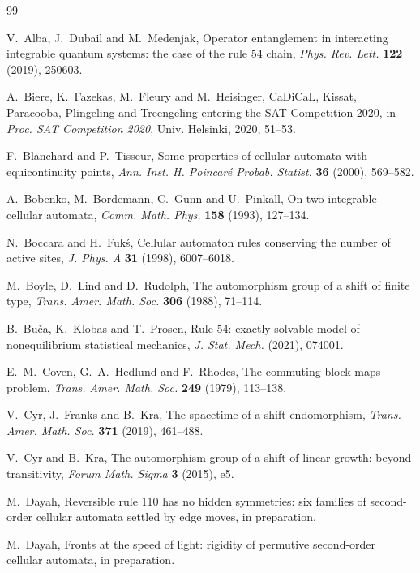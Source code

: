 \begin{thebibliography}{99}

 V.~Alba, J.~Dubail and M.~Medenjak, Operator entanglement in interacting integrable quantum systems: the case of the rule 54 chain, \emph{Phys. Rev. Lett.} \textbf{122} (2019), 250603.

 A.~Biere, K.~Fazekas, M.~Fleury and M.~Heisinger, CaDiCaL, Kissat, Paracooba, Plingeling and Treengeling entering the SAT Competition 2020, in \emph{Proc. SAT Competition 2020}, Univ. Helsinki, 2020, 51--53.

 F.~Blanchard and P.~Tisseur, Some properties of cellular automata with equicontinuity points, \emph{Ann. Inst. H. Poincar\'e Probab. Statist.} \textbf{36} (2000), 569--582.

 A.~Bobenko, M.~Bordemann, C.~Gunn and U.~Pinkall, On two integrable cellular automata, \emph{Comm. Math. Phys.} \textbf{158} (1993), 127--134.

 N.~Boccara and H.~Fuk\'s, Cellular automaton rules conserving the number of active sites, \emph{J. Phys. A} \textbf{31} (1998), 6007--6018.

 M.~Boyle, D.~Lind and D.~Rudolph, The automorphism group of a shift of finite type, \emph{Trans. Amer. Math. Soc.} \textbf{306} (1988), 71--114.

 B.~Bu\v{c}a, K.~Klobas and T.~Prosen, Rule 54: exactly solvable model of nonequilibrium statistical mechanics, \emph{J. Stat. Mech.} (2021), 074001.

 E.~M.~Coven, G.~A.~Hedlund and F.~Rhodes, The commuting block maps problem, \emph{Trans. Amer. Math. Soc.} \textbf{249} (1979), 113--138.

 V.~Cyr, J.~Franks and B.~Kra, The spacetime of a shift endomorphism, \emph{Trans. Amer. Math. Soc.} \textbf{371} (2019), 461--488.

 V.~Cyr and B.~Kra, The automorphism group of a shift of linear growth: beyond transitivity, \emph{Forum Math. Sigma} \textbf{3} (2015), e5.

 M.~Dayah, Reversible rule 110 has no hidden symmetries: six families of second-order cellular automata settled by edge moves, in preparation.

 M.~Dayah, Fronts at the speed of light: rigidity of permutive second-order cellular automata, in preparation.


\end{thebibliography}
